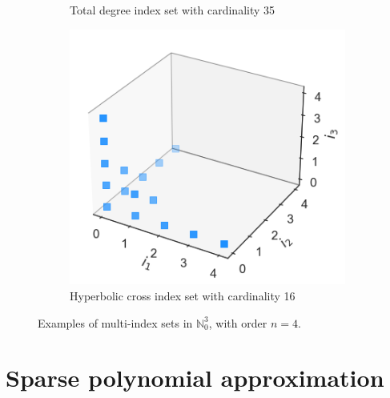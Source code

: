 \documentclass[12pt, oneside]{report}   	%
\newcommand{\N}{\mathbb{N}}
\begin{document}
\begin{figure}[t]
\begin{subfigure}[t]{.3\textwidth}
  		\caption{Total degree index set with cardinality 35}
 	 	\label{fig:test2}
	\end{subfigure}
	\begin{subfigure}[t]{.3\textwidth}
  		\centering
		\includegraphics[width=0.9\linewidth]{equad_multi3}
  		\caption{Hyperbolic cross index set with cardinality 16}
 	 	\label{fig:test3}
	\end{subfigure}
	\caption{Examples of multi-index sets in $\N_0^3$, with order $n=4$.}
    \label{fig:indexsets}
\end{figure}


\section{Sparse polynomial approximation}
\label{sec:sparse}
\end{document}
